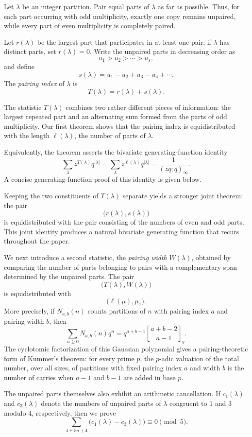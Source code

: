 \documentclass[11pt]{article}
\theoremstyle{definition}
\theoremstyle{remark}
\newcommand{\qbinom}[3][]{%
  \genfrac{[}{]}{0pt}{}{#2}{#3}_{#1}%
}
\begin{document}
Let $\lambda$ be an integer partition. Pair equal parts of $\lambda$ as far as possible.  Thus, for each part occurring with odd multiplicity, exactly one copy remains unpaired, while every part of even multiplicity is completely paired.

Let $r(\lambda)$ be the largest part that participates in at least one pair; if $\lambda$ has distinct parts, set $r(\lambda)=0$.  Write the unpaired parts in decreasing order as
\[
 u_1>u_2>\cdots>u_s,
\]
and define
\[
 s(\lambda)=u_1-u_2+u_3-u_4+\cdots.
\]
The \emph{pairing index} of $\lambda$ is
\[
 T(\lambda)=r(\lambda)+s(\lambda).
\]

The statistic $T(\lambda)$ combines two rather different pieces of information: the largest repeated part and an alternating sum formed from the parts of odd multiplicity. Our first theorem shows that the pairing index is equidistributed with the length $\ell(\lambda)$, the number of parts of $\lambda$.

Equivalently, the theorem asserts the bivariate generating-function identity
\[
 \sum_{\lambda} z^{T(\lambda)}q^{|\lambda|}
 =\sum_{\lambda} z^{\ell(\lambda)}q^{|\lambda|}
 =\frac{1}{(zq;q)_\infty}.
\]
A concise generating-function proof of this identity is given below. 

Keeping the two constituents of $T(\lambda)$ separate yields a stronger joint theorem: the pair
\[
 \bigl(r(\lambda),s(\lambda)\bigr)
\]
is equidistributed with the pair consisting of the numbers of even and odd parts.  This joint identity produces a natural bivariate generating function that recurs throughout the paper.

We next introduce a second statistic, the \emph{pairing width} $W(\lambda)$, obtained by comparing the number of parts belonging to pairs with a complementary span determined by the unpaired parts.  The pair
\[
 \bigl(T(\lambda),W(\lambda)\bigr)
\]
is equidistributed with
\[
 \bigl(\ell(\mu),\mu_1\bigr).
\]
More precisely, if $N_{a,b}(n)$ counts partitions of $n$ with pairing index $a$ and pairing width $b$, then
\[
 \sum_{n\geq0}N_{a,b}(n)q^n
 =q^{a+b-1}\qbinom[q]{a+b-2}{a-1}.
\]
The cyclotomic factorization of this Gaussian polynomial gives a pairing-theoretic form of Kummer's theorem: for every prime $p$, the $p$-adic valuation of the total number, over all sizes, of partitions with fixed pairing index $a$ and width $b$ is the number of carries when $a-1$ and $b-1$ are added in base $p$.

The unpaired parts themselves also exhibit an arithmetic cancellation.  If $c_1(\lambda)$ and $c_3(\lambda)$ denote the numbers of unpaired parts of $\lambda$ congruent to $1$ and $3$ modulo $4$, respectively, then we prove
\[
 \sum_{\lambda\vdash 5n+4}
 \bigl(c_1(\lambda)-c_3(\lambda)\bigr)\equiv0\pmod5.
\]
\end{document}
